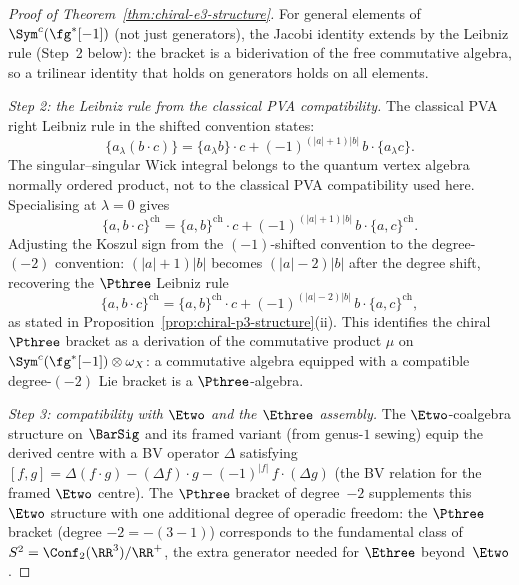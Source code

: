 \begin{proof}[Proof of Theorem~\ref{thm:chiral-e3-structure}]
For general elements of $\Sym^c(\fg^*[-1])$ (not just
generators), the Jacobi identity extends by the Leibniz
rule (Step~2 below): the bracket is a biderivation of the
free commutative algebra, so a trilinear identity that
holds on generators holds on all elements.

\textit{Step 2: the Leibniz rule from the classical PVA
compatibility.}
The classical PVA right Leibniz rule in the shifted convention
states:
\[
 \{a \mathbin{{}_\lambda} (b \cdot c)\}
 = \{a \mathbin{{}_\lambda} b\} \cdot c
 + (-1)^{(|a|+1)|b|}\,
 b \cdot \{a \mathbin{{}_\lambda} c\}.
\]
The singular--singular Wick integral belongs to the quantum vertex
algebra normally ordered product, not to the classical PVA
compatibility used here. Specialising at $\lambda = 0$ gives
\[
 \{a, b \cdot c\}^{\mathrm{ch}}
 = \{a, b\}^{\mathrm{ch}} \cdot c
 + (-1)^{(|a|+1)|b|}\,
 b \cdot \{a, c\}^{\mathrm{ch}}.
\]
Adjusting the Koszul sign from the $(-1)$-shifted
convention to the degree-$(-2)$ convention:
$(|a|+1)|b|$ becomes $(|a|-2)|b|$ after the degree shift,
recovering the $\Pthree$ Leibniz rule
\[
 \{a, b \cdot c\}^{\mathrm{ch}}
 = \{a, b\}^{\mathrm{ch}} \cdot c
 + (-1)^{(|a|-2)|b|}\,
 b \cdot \{a, c\}^{\mathrm{ch}},
\]
as stated in
Proposition~\ref{prop:chiral-p3-structure}(ii). This
identifies the chiral $\Pthree$ bracket as a derivation of
the commutative product
$\mu$ on $\Sym^c(\fg^*[-1]) \otimes \omega_X$: a
commutative algebra equipped with a compatible
degree-$(-2)$ Lie bracket is a $\Pthree$-algebra.

\textit{Step 3: compatibility with $\Etwo$ and the
$\Ethree$ assembly.}
The $\Etwo$-coalgebra structure on $\BarSig$
and its framed
variant (from genus-$1$ sewing) equip the derived centre
with a BV operator $\Delta$ satisfying
$[f, g] = \Delta(f \cdot g) - (\Delta f) \cdot g
- (-1)^{|f|}\,f \cdot (\Delta g)$
(the BV relation for the framed $\Etwo$ centre).
The $\Pthree$ bracket of degree~$-2$ supplements
this $\Etwo$ structure with one additional degree of
operadic freedom:
the $\Pthree$ bracket
(degree $-2 = -(3-1)$) corresponds to the fundamental
class of $S^2 = \Conf_2(\RR^3)/\RR^+$, the extra
generator needed for $\Ethree$ beyond~$\Etwo$.


\end{proof}
